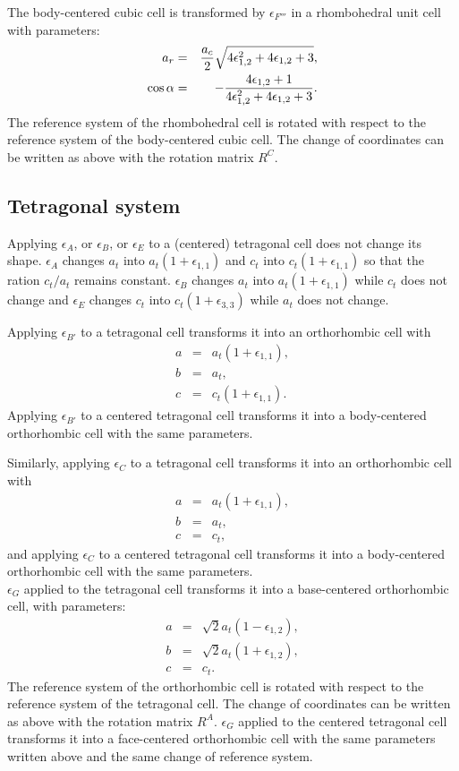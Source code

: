 \documentclass[12pt,a4paper]{article}
\begin{document}
The body-centered cubic cell is transformed by 
$\epsilon_{F'''}$ in a rhombohedral unit cell
with parameters:
\begin{eqnarray}
a_r&=& {a_c \over 2} \sqrt{ 4\epsilon_{1,2}^2 + 4\epsilon_{1,2} + 3 }, \\
\cos\alpha &=& -{4\epsilon_{1,2}+1 \over 4\epsilon_{1,2}^2+4\epsilon_{1,2}+3}.
\end{eqnarray}
The reference system of the rhombohedral cell is rotated with respect to
the reference system of the body-centered cubic cell. 
The change of coordinates can be written as above with the rotation matrix 
$R^C$.

\subsection{\color{web-blue}Tetragonal system}
Applying $\epsilon_A$, or $\epsilon_B$, or $\epsilon_E$ to a 
(centered) tetragonal cell
does not change its shape. $\epsilon_A$ changes $a_t$ into 
$a_t(1+\epsilon_{1,1})$ and $c_t$ into $c_t(1+\epsilon_{1,1})$ so that the
ration $c_t/a_t$ remains constant. 
$\epsilon_B$ changes $a_t$ into $a_t(1+\epsilon_{1,1})$
while $c_t$ does not change and $\epsilon_E$ changes  
$c_t$ into $c_t(1+\epsilon_{3,3})$ while $a_t$ does not change.

Applying $\epsilon_{B'}$ to a tetragonal cell transforms it into an  
orthorhombic cell with
\begin{eqnarray}
a&=& a_t (1+\epsilon_{1,1}), \\
b&=& a_t, \\
c&=& c_t (1+\epsilon_{1,1}).
\end{eqnarray}
Applying $\epsilon_{B'}$ to a centered tetragonal cell transforms it
into a body-centered orthorhombic cell with the same
parameters. 

Similarly, applying $\epsilon_C$ to a tetragonal cell transforms 
it into an  orthorhombic cell with
\begin{eqnarray}
a&=&a_t (1+\epsilon_{1,1}), \\
b&=&a_t, \\
c&=&c_t,
\end{eqnarray}
and applying $\epsilon_C$ to a centered tetragonal cell transforms it
into a body-centered orthorhombic cell with the same
parameters.\\

$\epsilon_G$ applied to the tetragonal cell transforms it into a 
base-centered orthorhombic cell, with parameters:
\begin{eqnarray}
a&=&\sqrt{2} a_t (1-\epsilon_{1,2}), \\
b&=&\sqrt{2} a_t (1+\epsilon_{1,2}) , \\
c&=&c_t.
\end{eqnarray}
The reference system of the orthorhombic cell is rotated with respect to
the reference system of the tetragonal cell. 
The change of coordinates can be written as above with the rotation matrix 
$R^A$.
$\epsilon_G$ applied to the centered tetragonal cell transforms it into
a face-centered orthorhombic cell with the same parameters written above
and the same change of reference system.
\end{document}
